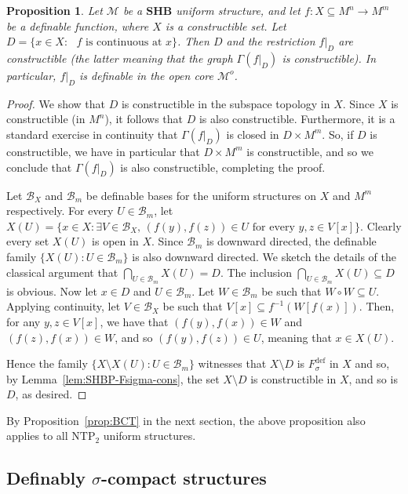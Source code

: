\documentclass[12pt]{article}
\newcommand{\Bb}{\mathcal{B}}
\newcommand{\Mm}{\mathcal{M}}
\newcommand{\dF}{\ensuremath{F_\sigma^{\text{def}}}}
\newcommand{\BP}{\textbf{SHB}}
\newcommand{\NTP}{\ensuremath{\mathrm{NTP}_2}}
\newcommand{\Mo}{\Mm^o}%
\newtheorem{proposition}[theorem]{Proposition}
\theoremstyle{definition}
\theoremstyle{remark}
\begin{document}
\begin{proposition}\label{prop:f_D}
Let $\Mm$ be a $\BP$ uniform structure, and let $f:X\subseteq M^n\rightarrow M^m$ be a definable function, where $X$ is a constructible set. Let $D=\{ x\in X : \text{ $f$ is continuous at $x$\}}$. Then $D$ and the restriction $f|_D$ are constructible (the latter meaning that the graph $\Gamma(f|_D)$ is constructible). In particular, $f|_D$ is definable in the open core $\Mo$.
\end{proposition}
\begin{proof}
We show that $D$ is constructible in the subspace topology in $X$. Since $X$ is constructible (in $M^n$), it follows that $D$ is also constructible. Furthermore, it is a standard exercise in continuity that $\Gamma(f|_D)$ is closed in $D\times M^m$. So, if $D$ is constructible, we have in particular that $D\times M^m$ is constructible, and so we conclude that $\Gamma(f|_D)$ is also constructible, completing the proof.

Let $\Bb_X$ and $\Bb_m$ be definable bases for the uniform structures on $X$ and $M^{m}$ respectively. For every $U\in \Bb_m$, let $X(U)=\{ x\in X : \exists V\in \Bb_X, \, (f(y),f(z))\in U \text{ for every } y,z\in V[x]\}$. Clearly every set $X(U)$ is open in $X$. Since $\Bb_m$ is downward directed, the definable family $\{X(U) : U\in \Bb_m\}$ is also downward directed. We sketch the details of the classical argument that $\bigcap_{U\in \Bb_m} X(U)=D$. The inclusion $\bigcap_{U\in \Bb_m} X(U) \subseteq D$ is obvious. Now let $x\in D$ and $U\in \Bb_m$. Let $W\in \Bb_m$ be such that $W\circ W \subseteq U$. Applying continuity, let $V\in \Bb_X$ be such that $V[x] \subseteq f^{-1}(W[f(x)])$. Then, for any $y, z \in V[x]$, we have that $(f(y),f(x))\in W$ and $(f(z),f(x))\in W$, and so $(f(y),f(z))\in U$, meaning that $x\in X(U)$. 

Hence the family $\{ X\setminus X(U) : U\in \Bb_m\}$ witnesses that $X\setminus D$ is $\dF$ in $X$ and so, by Lemma~\ref{lem:SHBP-Fsigma-cons}, the set $X\setminus D$ is constructible in $X$, and so is $D$, as desired. 
\end{proof}

By Proposition~\ref{prop:BCT} in the next section, the above proposition also applies to all $\NTP$ uniform structures. 

\subsection{Definably $\sigma$-compact structures}
\end{document}
